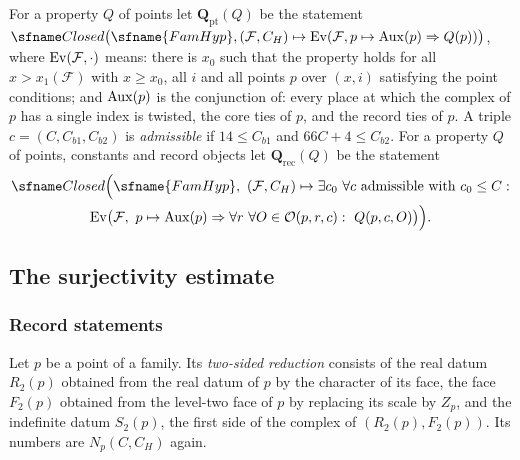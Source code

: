 \begin{definition}\label{pf:onto3:forall}
For a property $Q$ of points let $\mathbf Q_{\mathrm{pt}}(Q)$ be the statement
$\ontothreeClosed\bigl(\sfname{FamHyp},(\mathcal F,C_H)\mapsto\ontothreeEv(\mathcal F,p\mapsto\ontothreeMore(p)
\Rightarrow Q(p))\bigr)$, where $\mathrm{Ev}(\mathcal F,\cdot)$ means: there is $x_0$ such that the property holds for
all $x>x_1(\mathcal F)$ with $x\ge x_0$, all $i$ and all points $p$ over $(x,i)$ satisfying the point conditions; and
$\mathrm{Aux}(p)$ is the conjunction of: every place at which the complex of $p$ has a single index is twisted, the
core ties of $p$, and the record ties of $p$. A triple $c=(C,C_{b1},C_{b2})$ is \emph{admissible} if $14\le C_{b1}$ and
$66C+4\le C_{b2}$. For a property $Q$ of points, constants and record objects let $\mathbf Q_{\mathrm{rec}}(Q)$ be the
statement
\begin{multline*}
\ontothreeClosed\Bigl(\sfname{FamHyp},\ (\mathcal F,C_H)\mapsto\exists c_0\ \forall c\ \text{admissible with
}c_0\le C:\\ \ontothreeEv\bigl(\mathcal F,\ p\mapsto\ontothreeMore(p)\Rightarrow\forall r\ \forall O\in\mathcal
O(p,r,c):\ Q(p,c,O)\bigr)\Bigr).
\end{multline*}
\end{definition}

\subsection{The surjectivity estimate}\label{sec:pf:onto3:path}

\subsubsection{Record statements}

Let $p$ be a point of a family. Its \emph{two-sided reduction} consists of the real datum $R_2(p)$ obtained from the
real datum of $p$ by the character of its face, the face $F_2(p)$ obtained from the level-two face of $p$ by
replacing its scale by $Z_p$, and the indefinite datum $S_2(p)$, the first side of the complex of
$(R_2(p),F_2(p))$. Its numbers are $N_p(C,C_H)$ again.

